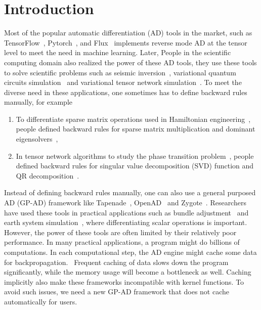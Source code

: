 \documentclass{article}
\newcommand{\<}{\langle}
\renewcommand{\>}{\rangle}
\renewcommand{\cite}[1]{{\citep{#1}}}
\theoremstyle{definition}\newtheorem{definition}{\textit{Definition}}
\begin{document}
\section{Introduction}\label{sec:intro}
  Most of the popular automatic differentiation (AD) tools in the market, such as TensorFlow~\cite{Tensorflow2015}, Pytorch~\cite{Paszke2017}, and Flux~\cite{Innes2018a} implements reverse mode AD at the tensor level to meet the need in machine learning. Later, People in the scientific computing domain also realized the power of these AD tools, they use these tools to solve scientific problems such as seismic inversion~\cite{Zhu2020}, variational quantum circuits simulation~\cite{Bergholm2018,Luo2019} and variational tensor network simulation~\cite{Liao2019,Roberts2019}. To meet the diverse need in these applications, one sometimes has to define backward rules manually, for example
\begin{enumerate}
\item To differentiate sparse matrix operations used in Hamiltonian engineering~\cite{Xie2020}, people defined backward rules for sparse matrix multiplication and dominant eigensolvers~\cite{Golub2012},
\item In tensor network algorithms to study the phase transition problem~\cite{Liao2019,Seeger2017,Wan2019,Hubig2019}, people defined backward rules for singular value decomposition (SVD) function and QR decomposition~\cite{Golub2012}.
\end{enumerate}
Instead of defining backward rules manually, one can also use a general purposed AD (GP-AD) framework like Tapenade~\cite{Hascoet2013}, OpenAD~\cite{Utke2008} and Zygote~\cite{Innes2018, Innes2019}.
Researchers have used these tools in practical applications such as bundle adjustment~\cite{Shen2018} and earth system simulation~\cite{Forget2015}, where differentiating scalar operations is important.
However, the power of these tools are often limited by their relatively poor performance. In many practical applications, a program might do billions of computations. In each computational step, the AD engine might cache some data for backpropagation.~\cite{Griewank2008} Frequent caching of data slows down the program significantly, while the memory usage will become a bottleneck as well. Caching implicitly also make these frameworks incompatible with kernel functions.
To avoid such issues, we need a new GP-AD framework that does not cache automatically for users.
\end{document}
